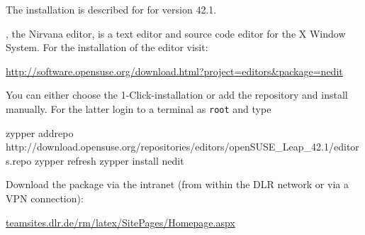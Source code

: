 % 
%               
%          
% 

The installation is described for \marktool{\opensusename} for version 42.1.


, the Nirvana editor, is a text editor and source code editor for the X Window System. For the installation of the editor  visit:

\href{http://software.opensuse.org/download.html?project=editors\&package=nedit}{http://software.opensuse.org/download.html?project=editors\&package=nedit}

You can either choose the 1-Click-installation or add the repository and install manually. For the latter login to a terminal as \verb+root+ and type

\begingroup
\lstset{breaklines=true}
\begin{code}
zypper addrepo http://download.opensuse.org/repositories/editors/openSUSE_Leap_42.1/editors.repo
zypper refresh
zypper install nedit
\end{code}
\endgroup

% 
% 
% 


	\label{sec:RM_LaTeX}

Download the package via the intranet (from within the DLR network or via a VPN connection):

\href{teamsites.dlr.de/rm/latex/SitePages/Homepage.aspx}{teamsites.dlr.de/rm/latex/SitePages/Homepage.aspx}

